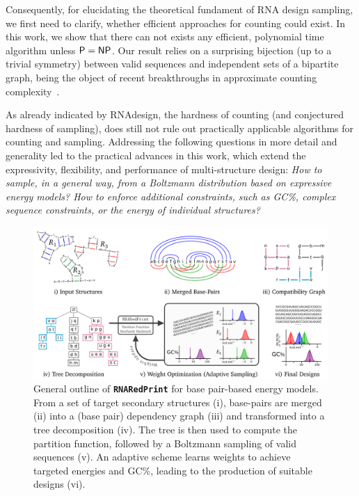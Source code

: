 \documentclass{bmcart}
\newcommand{\Nuc}[1]{{\sf #1}}
\newcommand{\Cb}{\Nuc{C}}
\newcommand{\Gb}{\Nuc{G}}
\newcommand{\GCb}{\Gb\Cb}
\newcommand{\Software}[1]{{\ttfamily #1}}
\newcommand{\ourprog}{{\tt \bfseries{}\color{black!85}RNA\textcolor{red!70!black}{Red}Print}}
\newcommand{\citep}[1]{\cite{#1}}
\begin{document}
Consequently, for elucidating the theoretical fundament of RNA design sampling, we first need to clarify, whether efficient approaches for counting could exist. In this work, we show that there can not exists any efficient, polynomial time algorithm unless ${\sf P}={\sf NP}$. Our result relies on a surprising bijection (up to a trivial symmetry) between valid sequences and independent sets of a bipartite graph, being the object of recent breakthroughs in approximate counting complexity~\citep{Bulatov2013,Cai2016}.

As already indicated by \Software{RNAdesign}, the hardness of counting (and conjectured hardness of sampling), does still not rule out practically applicable algorithms for counting and sampling.
Addressing the following questions in more detail and generality led to the practical advances in this work, which extend the expressivity, flexibility, and performance of multi-structure design: \emph{How to sample, in a general way, from a Boltzmann distribution based on expressive energy models? How to enforce additional constraints, such as \GCb\%, complex sequence constraints, or the energy of individual structures?}

\begin{figure}[t]
\begin{center}
    \includegraphics[width=.8\textwidth]{Figs/Workflow}
\end{center}
\caption{General outline of \ourprog{} for base pair-based energy models. From a set of target secondary structures (i), base-pairs are merged (ii) into a (base pair) dependency graph (iii) and transformed into a tree decomposition (iv). The tree is then used to compute the partition function, followed by a Boltzmann sampling of valid sequences (v). An adaptive scheme learns weights to achieve targeted energies and \GCb\%, leading to the production of suitable designs (vi).}
\label{fig:workflow}
\end{figure}
\end{document}
